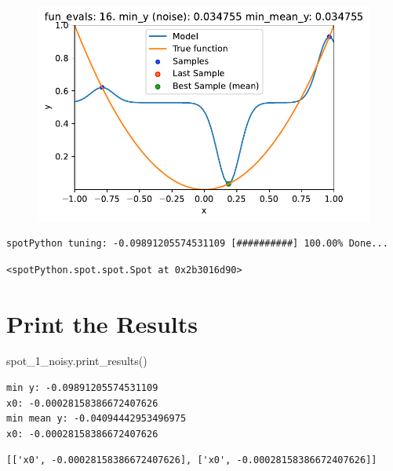 \documentclass[
  letterpaper,
  DIV=11,
  numbers=noendperiod]{scrreprt}
\newenvironment{Shaded}{\begin{snugshade}}{\end{snugshade}}
\newcommand{\NormalTok}[1]{\textcolor[rgb]{0.00,0.23,0.31}{#1}}
\begin{document}
\begin{figure}[H]

{\centering \includegraphics{014_num_spot_ocba_files/figure-pdf/cell-6-output-10.pdf}

}

\end{figure}

\begin{verbatim}
spotPython tuning: -0.09891205574531109 [##########] 100.00% Done...
\end{verbatim}

\begin{verbatim}
<spotPython.spot.spot.Spot at 0x2b3016d90>
\end{verbatim}

\hypertarget{print-the-results-4}{%
\section{Print the Results}\label{print-the-results-4}}

\begin{Shaded}
\begin{Highlighting}[]
\NormalTok{spot\_1\_noisy.print\_results()}
\end{Highlighting}
\end{Shaded}

\begin{verbatim}
min y: -0.09891205574531109
x0: -0.00028158386672407626
min mean y: -0.04094442953496975
x0: -0.00028158386672407626
\end{verbatim}

\begin{verbatim}
[['x0', -0.00028158386672407626], ['x0', -0.00028158386672407626]]
\end{verbatim}
\end{document}
